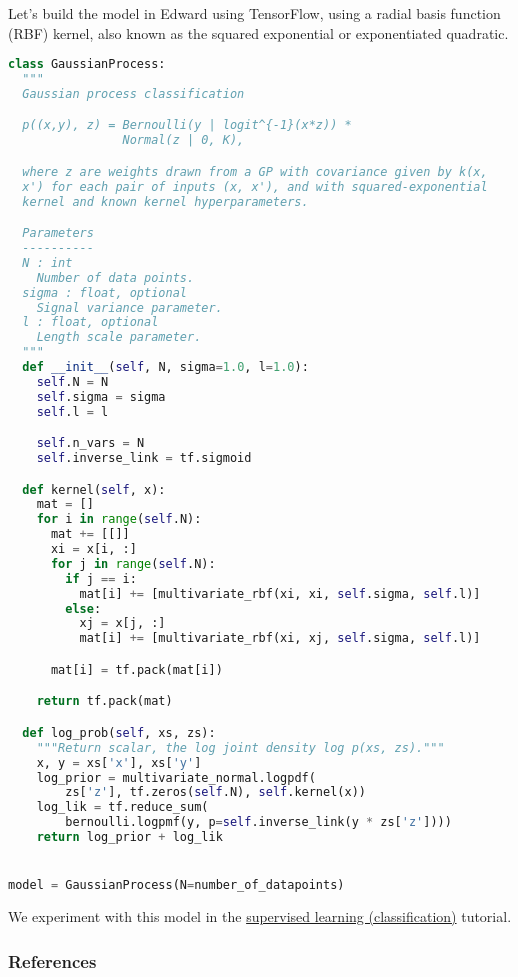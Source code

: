 Let's build the model in Edward using TensorFlow, using a radial basis function
(RBF) kernel, also known as the squared exponential or exponentiated quadratic.
\begin{lstlisting}[language=Python]
class GaussianProcess:
  """
  Gaussian process classification

  p((x,y), z) = Bernoulli(y | logit^{-1}(x*z)) *
                Normal(z | 0, K),

  where z are weights drawn from a GP with covariance given by k(x,
  x') for each pair of inputs (x, x'), and with squared-exponential
  kernel and known kernel hyperparameters.

  Parameters
  ----------
  N : int
    Number of data points.
  sigma : float, optional
    Signal variance parameter.
  l : float, optional
    Length scale parameter.
  """
  def __init__(self, N, sigma=1.0, l=1.0):
    self.N = N
    self.sigma = sigma
    self.l = l

    self.n_vars = N
    self.inverse_link = tf.sigmoid

  def kernel(self, x):
    mat = []
    for i in range(self.N):
      mat += [[]]
      xi = x[i, :]
      for j in range(self.N):
        if j == i:
          mat[i] += [multivariate_rbf(xi, xi, self.sigma, self.l)]
        else:
          xj = x[j, :]
          mat[i] += [multivariate_rbf(xi, xj, self.sigma, self.l)]

      mat[i] = tf.pack(mat[i])

    return tf.pack(mat)

  def log_prob(self, xs, zs):
    """Return scalar, the log joint density log p(xs, zs)."""
    x, y = xs['x'], xs['y']
    log_prior = multivariate_normal.logpdf(
        zs['z'], tf.zeros(self.N), self.kernel(x))
    log_lik = tf.reduce_sum(
        bernoulli.logpmf(y, p=self.inverse_link(y * zs['z'])))
    return log_prior + log_lik


model = GaussianProcess(N=number_of_datapoints)
\end{lstlisting}

We experiment with this model in the
\href{/tutorials/supervised-classification}{supervised learning (classification)} tutorial.

\subsubsection{References}\label{references}
